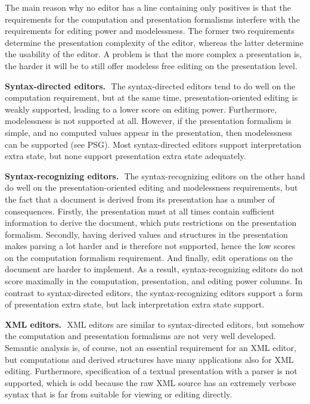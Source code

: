 \documentclass{speauth}
\begin{document}
The main reason why no editor has a line containing only positives is that the requirements for the computation and presentation formalisms interfere with the requirements for editing power and modelessness. The former two requirements determine the presentation complexity of the editor, whereas the latter determine the usability of the editor. A problem is that the more complex a presentation is, the harder it will be to still offer modeless free editing on the presentation level.

{\bf Syntax-directed editors.}~\,The syntax-directed editors tend to do well on the computation requirement, but at the same time, presentation-oriented editing is weakly supported, leading to a lower score on editing power. Furthermore, modelessness is not supported at all. However, if the presentation formalism is simple, and no computed values appear in the presentation, then modelessness can be supported (see PSG). Most syntax-directed editors support interpretation extra state, but none support presentation extra state adequately.

{\bf Syntax-recognizing editors.}~\,The syntax-recognizing editors on the other hand do well on the presentation-oriented editing and modelessness requirements, but the fact that a document is derived from its presentation has a number of consequences. Firstly, the presentation must at all times contain sufficient information to derive the document, which puts restrictions on the presentation formalism. Secondly, having derived values and structures in the presentation makes parsing a lot harder and is therefore not supported, hence the low scores on the computation formalism requirement. And finally, edit operations on the document are harder to implement. As a result, syntax-recognizing editors do not score maximally in the computation, presentation, and editing power columns. In contrast to syntax-directed editors, the syntax-recognizing editors support a form of presentation extra state, but lack interpretation extra state support.

{\bf XML editors.}~\,XML editors are similar to syntax-directed editors, but somehow the computation and presentation formalisms are not very well developed. Semantic analysis is, of course, not an essential requirement for an XML editor, but computations and derived structures have many applications also for XML editing. Furthermore, specification of a textual presentation with a parser is not supported, which is odd because the raw XML source has an extremely verbose syntax that is far from suitable for viewing or editing directly.
\end{document}
